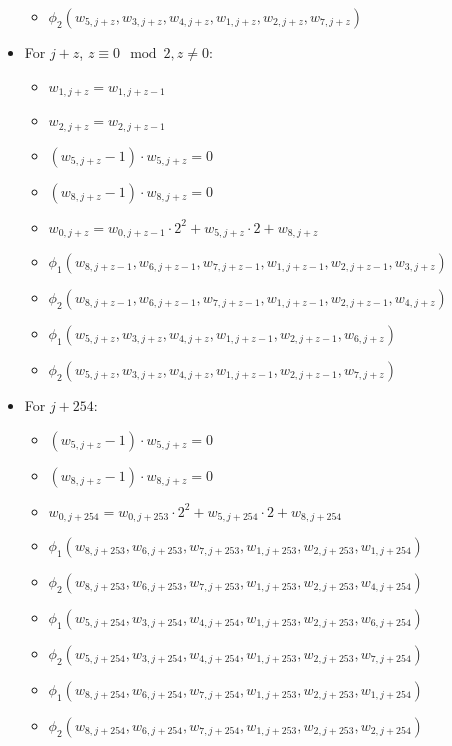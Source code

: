 \begin{itemize}
\begin{itemize}
            \item $\phi_2(w_{5, j + z}, w_{3, j + z}, w_{4, j + z}, w_{1, j + z}, w_{2, j + z}, w_{7, j + z})$         
        \end{itemize}
    \item For $j + z$, $z \equiv 0 \mod 2, z \neq 0$:
        \begin{itemize}
        	\item $w_{1, j + z} = w_{1, j + z - 1}$
        	\item $w_{2, j + z} = w_{2, j + z - 1}$
            \item $(w_{5, j + z} - 1) \cdot w_{5, j + z} = 0$
        	 \item $(w_{8, j + z} - 1) \cdot w_{8, j + z} = 0$
            \item $w_{0, j + z} = w_{0, j + z - 1} \cdot 2^2 + w_{5, j + z} \cdot 2 + w_{8, j + z}$
            \item $\phi_1(w_{8, j + z - 1}, w_{6, j + z - 1}, w_{7, j + z - 1}, w_{1, j + z - 1}, w_{2, j + z - 1}, w_{3, j + z})$
            \item $\phi_2(w_{8, j + z - 1}, w_{6, j + z - 1}, w_{7, j + z - 1}, w_{1, j + z - 1}, w_{2, j + z - 1}, w_{4, j + z})$
            \item $\phi_1(w_{5, j + z}, w_{3, j + z}, w_{4, j + z}, w_{1, j + z - 1}, w_{2, j + z - 1}, w_{6, j + z})$
            \item $\phi_2(w_{5, j + z}, w_{3, j + z}, w_{4, j + z}, w_{1, j + z - 1}, w_{2, j + z - 1}, w_{7, j + z})$         
        \end{itemize}
    \item For $j + 254$:
        \begin{itemize}
        	 \item $(w_{5, j + z} - 1) \cdot w_{5, j + z} = 0$
        	 \item $(w_{8, j + z} - 1) \cdot w_{8, j + z} = 0$
            \item $w_{0, j + 254} = w_{0, j + 253} \cdot 2^2 + w_{5, j + 254} \cdot 2 + w_{8, j + 254}$
            \item $\phi_1(w_{8, j + 253}, w_{6, j + 253}, w_{7, j + 253}, w_{1, j + 253}, w_{2, j + 253}, w_{1, j + 254})$
            \item $\phi_2(w_{8, j + 253}, w_{6, j + 253}, w_{7, j + 253}, w_{1, j + 253}, w_{2, j + 253}, w_{4, j + 254})$
            \item $\phi_1(w_{5, j + 254}, w_{3, j + 254}, w_{4, j + 254}, w_{1, j + 253}, w_{2, j + 253}, w_{6, j + 254})$
            \item $\phi_2(w_{5, j + 254}, w_{3, j + 254}, w_{4, j + 254}, w_{1, j + 253}, w_{2, j + 253}, w_{7, j + 254})$
            \item $\phi_1(w_{8, j + 254}, w_{6, j + 254}, w_{7, j + 254}, w_{1, j + 253}, w_{2, j + 253}, w_{1, j + 254})$
            \item $\phi_2(w_{8, j + 254}, w_{6, j + 254}, w_{7, j + 254}, w_{1, j + 253}, w_{2, j + 253}, w_{2, j + 254})$ 
        \end{itemize}

\end{itemize}
